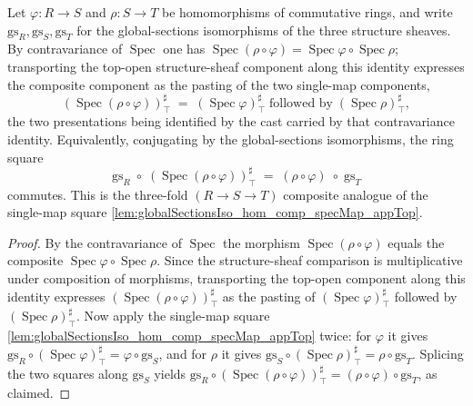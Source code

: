 \begin{lemma}



  \label{lem:globalSectionsIso_hom_comp3_specMap_appTop}
  Let \(\varphi : R \to S\) and \(\rho : S \to T\) be homomorphisms of commutative
  rings, and write \(\mathrm{gs}_R, \mathrm{gs}_S, \mathrm{gs}_T\) for the
  global-sections isomorphisms of the three structure sheaves. By contravariance of
  \(\operatorname{Spec}\) one has
  \(\operatorname{Spec}(\rho\circ\varphi) = \operatorname{Spec}\varphi \circ
  \operatorname{Spec}\rho\); transporting the top-open structure-sheaf component along
  this identity expresses the composite component as the pasting of the two single-map
  components,
  \[
    (\operatorname{Spec}(\rho\circ\varphi))^{\sharp}_{\top}
      \;=\;
    (\operatorname{Spec}\varphi)^{\sharp}_{\top}
      \;\text{followed by}\;
    (\operatorname{Spec}\rho)^{\sharp}_{\top},
  \]
  the two presentations being identified by the cast carried by that contravariance
  identity. Equivalently, conjugating by the global-sections isomorphisms, the ring
  square
  \[
    \mathrm{gs}_R \;\circ\; (\operatorname{Spec}(\rho\circ\varphi))^{\sharp}_{\top}
    \;=\; (\rho\circ\varphi) \;\circ\; \mathrm{gs}_T
  \]
  commutes. This is the three-fold \((R \to S \to T)\) composite analogue of the
  single-map square \cref{lem:globalSectionsIso_hom_comp_specMap_appTop}.
\end{lemma}

\begin{proof}
  By the contravariance of \(\operatorname{Spec}\) the morphism
  \(\operatorname{Spec}(\rho\circ\varphi)\) equals the composite
  \(\operatorname{Spec}\varphi \circ \operatorname{Spec}\rho\). Since the structure-sheaf
  comparison is multiplicative under composition of morphisms, transporting the top-open
  component along this identity expresses
  \((\operatorname{Spec}(\rho\circ\varphi))^{\sharp}_{\top}\) as the pasting of
  \((\operatorname{Spec}\varphi)^{\sharp}_{\top}\) followed by
  \((\operatorname{Spec}\rho)^{\sharp}_{\top}\). Now apply the single-map square
  \cref{lem:globalSectionsIso_hom_comp_specMap_appTop} twice: for \(\varphi\) it gives
  \(\mathrm{gs}_R \circ (\operatorname{Spec}\varphi)^{\sharp}_{\top}
  = \varphi \circ \mathrm{gs}_S\), and for \(\rho\) it gives
  \(\mathrm{gs}_S \circ (\operatorname{Spec}\rho)^{\sharp}_{\top}
  = \rho \circ \mathrm{gs}_T\). Splicing the two squares along \(\mathrm{gs}_S\) yields
  \(\mathrm{gs}_R \circ (\operatorname{Spec}(\rho\circ\varphi))^{\sharp}_{\top}
  = (\rho\circ\varphi) \circ \mathrm{gs}_T\), as claimed.
\end{proof}

